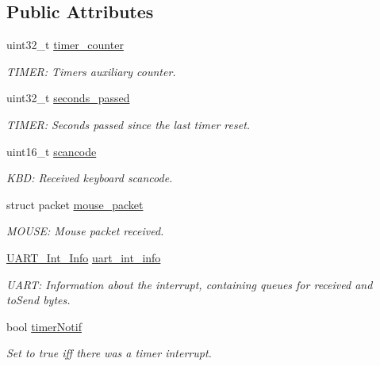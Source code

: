 \subsection*{Public Attributes}
\begin{DoxyCompactItemize}
\item 
uint32\+\_\+t \mbox{\hyperlink{group__interrupts_ga4b14f767b21a6ae59f9832df85ac2338}{timer\+\_\+counter}}
\begin{DoxyCompactList}\small\item\em T\+I\+M\+ER\+: Timer\textquotesingle{}s auxiliary counter. \end{DoxyCompactList}\item 
uint32\+\_\+t \mbox{\hyperlink{group__interrupts_ga7f2430cd3f169c5f1fd04426301adebf}{seconds\+\_\+passed}}
\begin{DoxyCompactList}\small\item\em T\+I\+M\+ER\+: Seconds passed since the last timer reset. \end{DoxyCompactList}\item 
uint16\+\_\+t \mbox{\hyperlink{group__interrupts_ga9744d7e28d7785b2f3ef9e9dfedcbbf8}{scancode}}
\begin{DoxyCompactList}\small\item\em K\+BD\+: Received keyboard scancode. \end{DoxyCompactList}\item 
struct packet \mbox{\hyperlink{group__interrupts_ga44ddd85ef55e76d85d28b611b892ee49}{mouse\+\_\+packet}}
\begin{DoxyCompactList}\small\item\em M\+O\+U\+SE\+: Mouse packet received. \end{DoxyCompactList}\item 
\mbox{\hyperlink{struct_u_a_r_t___int___info}{U\+A\+R\+T\+\_\+\+Int\+\_\+\+Info}} \mbox{\hyperlink{group__interrupts_ga440aaa950e50448a628bba417bce3ce7}{uart\+\_\+int\+\_\+info}}
\begin{DoxyCompactList}\small\item\em U\+A\+RT\+: Information about the interrupt, containing queues for received and to\+Send bytes. \end{DoxyCompactList}\item 
bool \mbox{\hyperlink{group__interrupts_gaba77f917764b3f473bccd4d28f9ab312}{timer\+Notif}}
\begin{DoxyCompactList}\small\item\em Set to true iff there was a timer interrupt. \end{DoxyCompactList}\item 

\end{DoxyCompactItemize}
